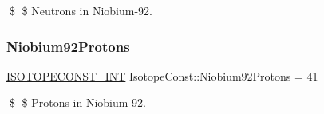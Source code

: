 \$ \$ Neutrons in Niobium-\/92. \mbox{\label{group___isotope_const-_niobium-_nb92_gad7fffb4b8f01187b02cffb0f05009b2e}} 
\subsubsection{\texorpdfstring{Niobium92\+Protons}{Niobium92Protons}}
{\footnotesize\ttfamily \mbox{\hyperlink{group___isotope_const-_macros_ga5f18360b3e99483a35c32d789e62621c}{I\+S\+O\+T\+O\+P\+E\+C\+O\+N\+S\+T\+\_\+\+I\+NT}} Isotope\+Const\+::\+Niobium92\+Protons = 41}

\$ \$ Protons in Niobium-\/92. 